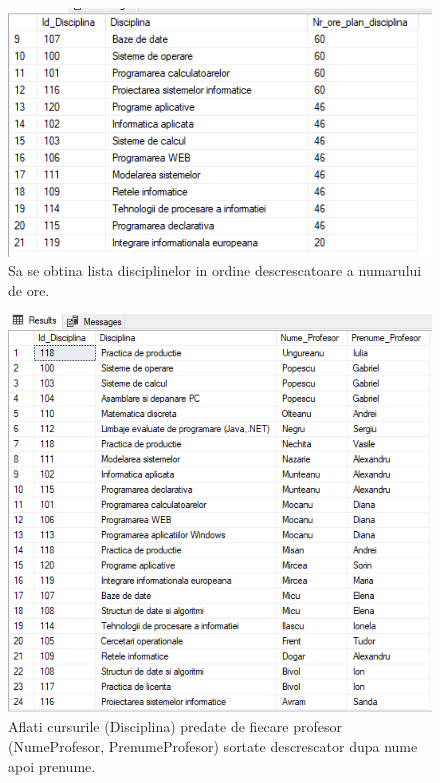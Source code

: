 \documentclass[12pt]{article}
\begin{document}
        \begin{figure}[H]
                \centering
                \includegraphics[width=.95\textwidth]{img2.png}
                \caption{Sa se obtina lista disciplinelor in ordine descrescatoare a numarului de ore.  }
        \end{figure}
        \vspace{0.5 cm}

        
        \begin{figure}[H]
                \centering
                \includegraphics[width=.95\textwidth]{img3.png}
                \caption{Aflati cursurile (Disciplina) predate de fiecare profesor (NumeProfesor, PrenumeProfesor) sortate descrescator dupa nume apoi prenume.}
        \end{figure}
        \vspace{0.5 cm}
\end{document}
